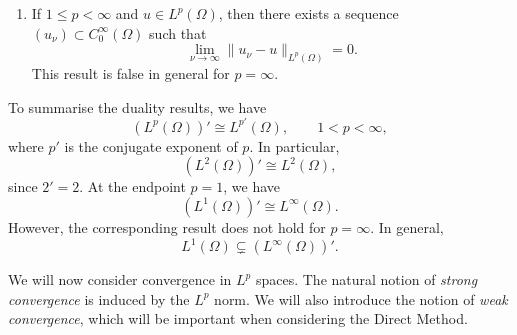 \begin{theorem}
\begin{enumerate}
        \item[(vi)] If $1\leq p<\infty$ and $u\in L^p(\Omega)$, then there
        exists a sequence $(u_\nu)\subset C^\infty_0(\Omega)$ such that
        \[
            \lim_{\nu\rightarrow\infty}
            \|u_\nu-u\|_{L^p(\Omega)}
            =
            0.
        \]
        This result is false in general for $p=\infty$.
    \end{enumerate}
\end{theorem}

\begin{remark}
    \label{rem:Lp-duality}

    To summarise the duality results, we have
    \[
        (L^p(\Omega))' \cong L^{p'}(\Omega),
        \qquad 1<p<\infty,
    \]
    where $p'$ is the conjugate exponent of $p$. In particular,
    \[
        (L^2(\Omega))' \cong L^2(\Omega),
    \]
    since $2'=2$. At the endpoint $p=1$, we have
    \[
        (L^1(\Omega))' \cong L^\infty(\Omega).
    \]
    However, the corresponding result does not hold for $p=\infty$.
    In general,
    \[
        L^1(\Omega)\subsetneq (L^\infty(\Omega))'.
    \]
\end{remark}

We will now consider convergence in $L^p$ spaces. The natural notion of \textit{strong convergence} is induced by the $L^p$ norm. We will also introduce the notion of \textit{weak convergence}, which will be important when considering the Direct Method.

